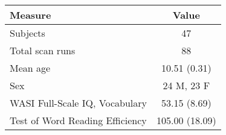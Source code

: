 \begin{tabular}{lc}
\toprule
Measure &               Value \\
\midrule
Subjects                        &              47 \\
Total scan runs                 &              88 \\
Mean age                        &    10.51 (0.31) \\
Sex                             &      24 M, 23 F \\
WASI Full-Scale IQ, Vocabulary  &    53.15 (8.69) \\
Test of Word Reading Efficiency &  105.00 (18.09) \\
\bottomrule
\end{tabular}